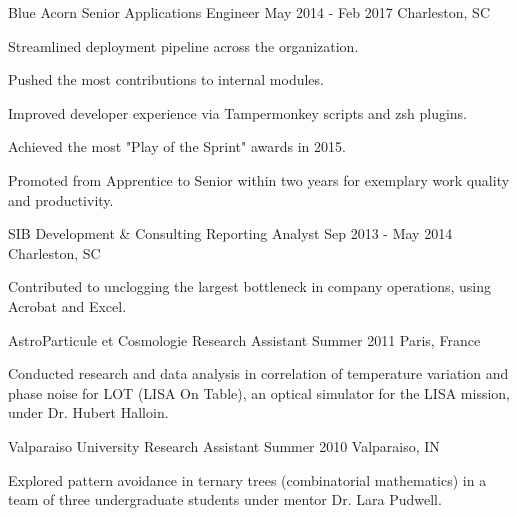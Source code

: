 

\begin{cventries}

  \cventry
    {Blue Acorn} %
    {Senior Applications Engineer} %
    {May 2014 - Feb 2017} %
    {Charleston, SC} %
    {
      \begin{cvitems} %
        \item {Streamlined deployment pipeline across the organization.}
        \item {Pushed the most contributions to internal modules.}
        \item {Improved developer experience via Tampermonkey scripts and zsh plugins.}
        \item {Achieved the most "Play of the Sprint" awards in 2015.}
        \item {Promoted from Apprentice to Senior within two years for exemplary work quality and productivity.}
      \end{cvitems}
    }

  \cventry
    {SIB Development \& Consulting}
    {Reporting Analyst}
    {Sep 2013 - May 2014}
    {Charleston, SC}
    {
      \begin{cvitems}
        \item {Contributed to unclogging the largest bottleneck in company operations, using Acrobat and Excel.}
      \end{cvitems}
    }

  \cventry
    {AstroParticule et Cosmologie}
    {Research Assistant}
    {Summer 2011}
    {Paris, France}
    {
      \begin{cvitems}
        \item {Conducted research and data analysis in correlation of temperature variation and phase noise for LOT (LISA On Table), an optical simulator for the LISA mission, under Dr. Hubert Halloin.}
      \end{cvitems}
    }

  \cventry
    {Valparaiso University}
    {Research Assistant}
    {Summer 2010}
    {Valparaiso, IN}
    {
      \begin{cvitems}
        \item {Explored pattern avoidance in ternary trees (combinatorial mathematics) in a team of three undergraduate students under mentor Dr. Lara Pudwell.}
      \end{cvitems}
    }

\end{cventries}
